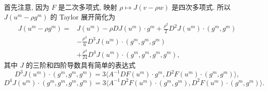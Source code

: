 首先注意, 因为 $F$ 是二次多项式, 映射 $\rho\mapsto J(v-\rho w)$ 是四次多项式.
所以 $J(u^m-\rho g^m)$ 的 Taylor 展开简化为
\begin{equation}
\label{eq:navier-least-squares-quartic-expansion}
\begin{aligned}
J(u^m-\rho g^m)
={}&J(u^m)-\rho DJ(u^m)\mathbin{\cdot}g^m
+\frac{\rho^2}{2}D^2J(u^m)\mathbin{\cdot}(g^m,g^m)\\
&-\frac{\rho^3}{6}D^3J(u^m)\mathbin{\cdot}(g^m,g^m,g^m)\\
&+\frac{\rho^4}{24}D^4J(u^m)\mathbin{\cdot}(g^m,g^m,g^m,g^m),
\end{aligned}
\end{equation}
其中 $J$ 的三阶和四阶导数具有简单的表达式
\[
D^3J(u^m)\mathbin{\cdot}(g^m,g^m,g^m)
=3\langle A^{-1}DF(u^m)\mathbin{\cdot}g^m,
D^2F(u^m)\mathbin{\cdot}(g^m,g^m)\rangle,
\]
\[
D^4J(u^m)\mathbin{\cdot}(g^m,g^m,g^m,g^m)
=3\langle A^{-1}D^2F(u^m)\mathbin{\cdot}(g^m,g^m),
D^2F(u^m)\mathbin{\cdot}(g^m,g^m)\rangle.
\]

